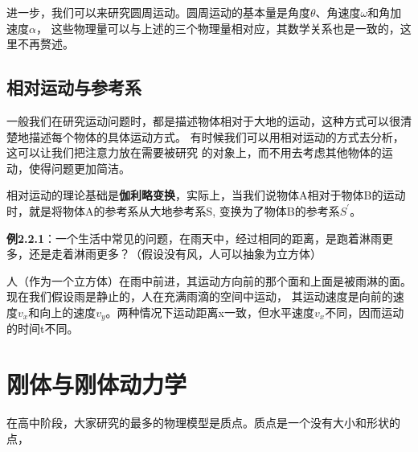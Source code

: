 \documentclass{article}
\begin{document}
    进一步，我们可以来研究圆周运动。圆周运动的基本量是角度\(\theta\)、角速度\(\omega\)和角加速度\(\alpha\)，
    这些物理量可以与上述的三个物理量相对应，其数学关系也是一致的，这里不再赘述。

\subsection{相对运动与参考系}
    一般我们在研究运动问题时，都是描述物体相对于大地的运动，这种方式可以很清楚地描述每个物体的具体运动方式。
    有时候我们可以用相对运动的方式去分析，这可以让我们把注意力放在需要被研究
    的对象上，而不用去考虑其他物体的运动，使得问题更加简洁。

    相对运动的理论基础是{\bfseries 伽利略变换}，实际上，当我们说物体A相对于物体B的运动时，就是将物体A的参考系从大地参考系S,
    变换为了物体B的参考系\(S^\prime\)。

    \textbf{例2.2.1}：一个生活中常见的问题，在雨天中，经过相同的距离，是跑着淋雨更多，还是走着淋雨更多？（假设没有风，人可以抽象为立方体）

    人（作为一个立方体）在雨中前进，其运动方向前的那个面和上面是被雨淋的面。现在我们假设雨是静止的，人在充满雨滴的空间中运动，
    其运动速度是向前的速度\(v_x\)和向上的速度\(v_y\)。两种情况下运动距离x一致，但水平速度\(v_x\)不同，因而运动的时间t不同。




\section{刚体与刚体动力学}
    在高中阶段，大家研究的最多的物理模型是质点。质点是一个没有大小和形状的点，
\end{document}
